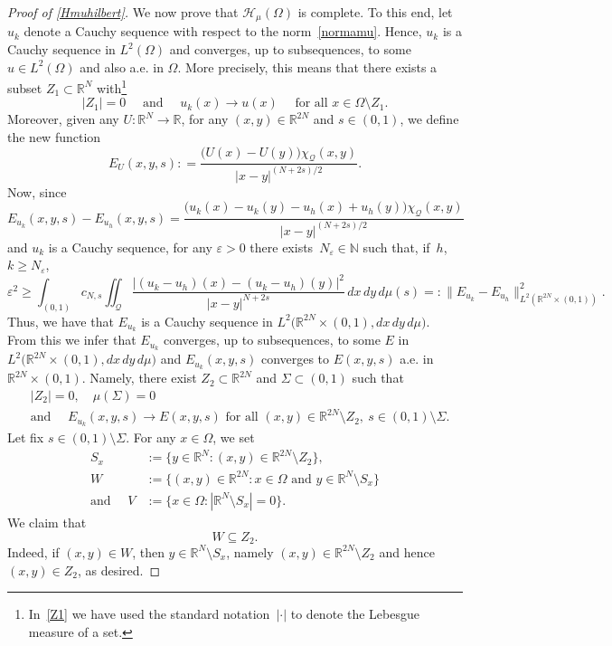 \documentclass[12pt,a4paper,intlimits,sumlimits]{amsart}
\def \N {\mathbb{N}}
\def \R {\mathbb{R}}
\def \Q {\mathcal Q}
\theoremstyle{definition}
\theoremstyle{plain}
\numberwithin{equation}{section}
\renewcommand{\ge}{\geqslant}
\begin{document}
\begin{appendix}
\begin{proof}[Proof of \eqref{Hmuhilbert}]
We now prove that $\mathcal{H}_\mu(\Omega)$ is complete. To this end,  let $u_k$ denote a Cauchy sequence with respect to the norm~\eqref{normamu}. Hence, $u_k$ is a Cauchy sequence in $L^2(\Omega)$ and converges, up to subsequences, to some $u\in L^2(\Omega)$ and also a.e. in $\Omega$. More precisely, this means that there exists a subset $Z_1\subset\R^N$ with\footnote{In~\eqref{Z1} we have used the standard notation~$|\cdot|$ to denote the Lebesgue measure of a set.}
\begin{equation}\label{Z1}
|Z_1|=0 \quad\mbox{ and }\quad u_k(x)\to u(x)\quad \mbox{ for all } x\in\Omega\setminus Z_1.
\end{equation}
Moreover, given any $U:\R^N\to\R$, for any $(x, y)\in\R^{2N}$ and $s\in (0, 1)$, we define the new function
\begin{equation}\label{Edefn}
E_U(x, y, s): = \frac{\big(U(x)-U(y)\big)\chi_{\Q}(x, y)}{|x-y|^{(N+2s)/2}}.
\end{equation}
Now, since
\[
E_{u_k}(x, y, s) - E_{u_h}(x, y, s) = \frac{\big(u_k(x) -u_k(y) -u_h(x) + u_h(y)\big)\chi_{\Q}(x, y)}{|x-y|^{(N+2s)/2}}
\]
and $u_k$ is a Cauchy sequence, for any $\varepsilon>0$ there exists~$N_\varepsilon\in\N$ such that, if~$h$, $k\ge N_\varepsilon$, 
\[
\varepsilon^2 \ge \int_{(0, 1)} c_{N, s} \iint_{\Q}\frac{|(u_k -u_h)(x) -(u_k -u_h)(y)|^2}{|x-y|^{N+2s}} \, dx \,dy\, d\mu (s) =: \|E_{u_k} - E_{u_h}\|^2_{L^2(\R^{2N}\times (0, 1))}.
\]
Thus, we have that $E_{u_k}$ is a Cauchy sequence in $L^2 \big(\R^{2N}\times (0, 1), dx\,dy\, d\mu\big)$. {F}rom this we infer that  $E_{u_k}$ converges, up to subsequences, to some $E$ in $L^2\big(\R^{2N}\times (0, 1), dx\,dy\, d\mu\big)$ and $E_{u_k}(x, y, s)$ converges to $E(x, y, s)$ a.e. in $\R^{2N}\times (0, 1)$.
Namely, there exist $Z_2\subset \R^{2N}$ and $\Sigma\subset (0, 1)$ such that
\begin{equation}\label{Z2}
\begin{split}
&|Z_2|=0, \quad \mu(\Sigma)=0 \\
&\mbox{and }\quad E_{u_k}(x, y, s) \to E(x, y, s) \mbox{ for all } (x, y)\in\R^{2N}\setminus Z_2, \ s\in (0, 1)\setminus\Sigma.
\end{split}
\end{equation}
Let fix $s\in (0, 1)\setminus\Sigma$. For any $x\in\Omega$, we set
\begin{align*}
S_x&:=\{y\in\R^N : (x, y)\in\R^{2N}\setminus Z_2\},\\
W&:= \{(x, y)\in\R^{2N} : x\in\Omega \mbox{ and } y\in\R^N\setminus S_x\}\\
{\mbox{and }}\quad V&:=\{x\in\Omega : |\R^N\setminus S_x|=0\}.
\end{align*}
We claim that
\begin{equation}\label{inZ2}
W\subseteq Z_2.
\end{equation}
Indeed, if $(x, y)\in W$, then $y\in\R^N\setminus S_x$, namely $(x, y)\in \R^{2N}\setminus Z_2$ and hence $(x, y)\in Z_2$, as desired. 


\end{proof}
\end{appendix}
\end{document}
